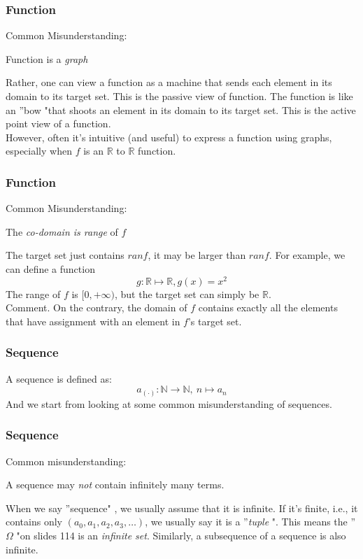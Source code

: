 \documentclass[12pt, t]{beamer}
\renewcommand{\emph}[1]{{\color{Turquoise3}\textsl{#1}}}
\begin{document}
\begin{frame}
    \frametitle{Function}
Common Misunderstanding:\\
\begin{center}
    Function is a \emph{graph}
\end{center}
\hspace{1em} Rather, one can view a function as a machine that sends each element in its domain to its target set. 
This is the passive view of function. The function is like an ''bow "that shoots an element in its domain to its 
target set. This is the active point view of a function.\\
\vspace{1em}
\hspace{1em} However, often it's intuitive (and useful) to express a function using graphs, especially when $f$ is an 
$\mathbb{R}$ to $\mathbb{R}$ function.
\end{frame}

\begin{frame}
    \frametitle{Function}
Common Misunderstanding:\\
\begin{center}
    The \emph{co-domain is range} of $f$
\end{center}
\hspace{1em} The target set just contains $ranf$, it may be larger than $ranf$. For example, we can define a function 
\begin{equation*}
    g: \mathbb{R}\longmapsto \mathbb{R}, g(x)=x^2
\end{equation*}
\hspace{1em} The range of $f$ is $[0,+\infty)$, but the target set can simply be $\mathbb{R}$.\\
\vspace{4em}
Comment. On the contrary, the domain of $f$ contains exactly all the elements that have assignment with an element in 
$f$'s target set.
\end{frame}

\begin{frame}
    \frametitle{Sequence}
A sequence is defined as:
\begin{equation*}
    a_{(\cdot)}:\mathbb{N}\rightarrow \mathbb{N}, \ n\longmapsto a_n
\end{equation*}
And we start from looking at some common misunderstanding of sequences.
\end{frame}

\begin{frame}
    \frametitle{Sequence}
Common misunderstanding:
\begin{center}
    A sequence may \emph{not} contain infinitely many terms.
\end{center}
\hspace{1em} When we say ''sequence" , we usually assume that it is infinite. If it's finite, i.e., it 
contains only $(a_0,a_1,a_2,a_3,\dots)$, we usually say it is a ''\emph{tuple} ". This means 
the ''$\Omega$ "on slides 114 is an \emph{infinite set}. Similarly, a subsequence of a sequence is also infinite.
\end{frame}
\end{document}
